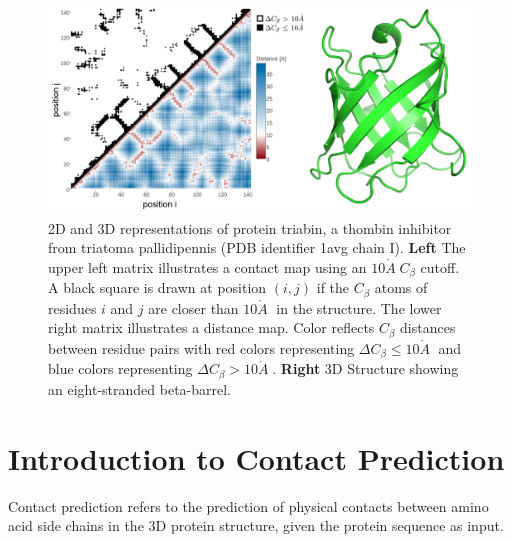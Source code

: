 \documentclass[11pt,a4paper,twoside]{book}
\newcommand{\Cb}{C_\beta}
\newcommand{\angstrom}{\mathring{A} \;}
\theoremstyle{definition}
\theoremstyle{definition}
\theoremstyle{remark}
\begin{document}
\begin{figure}

{\centering \includegraphics[width=1\linewidth]{img/intro/contat_map_and_structure_1avgi00} 

}

\caption{2D and 3D representations of protein triabin,
a thombin inhibitor from triatoma pallidipennis (PDB identifier 1avg
chain I). \textbf{Left} The upper left matrix illustrates a contact map
using an \(10 \angstrom \Cb\) cutoff. A black square is drawn at
position \((i, j)\) if the \(\Cb\) atoms of residues \(i\) and \(j\) are
closer than \(10 \angstrom\) in the structure. The lower right matrix
illustrates a distance map. Color reflects \(\Cb\) distances between
residue pairs with red colors representing
\(\Delta \Cb \le 10 \angstrom\) and blue colors representing
\(\Delta \Cb > 10 \angstrom\). \textbf{Right} 3D Structure showing an
eight-stranded beta-barrel.}\label{fig:contact-map}
\end{figure}

\section{Introduction to Contact
Prediction}\label{introduction-to-contact-prediction}

Contact prediction refers to the prediction of physical contacts between
amino acid side chains in the 3D protein structure, given the protein
sequence as input.
\end{document}
